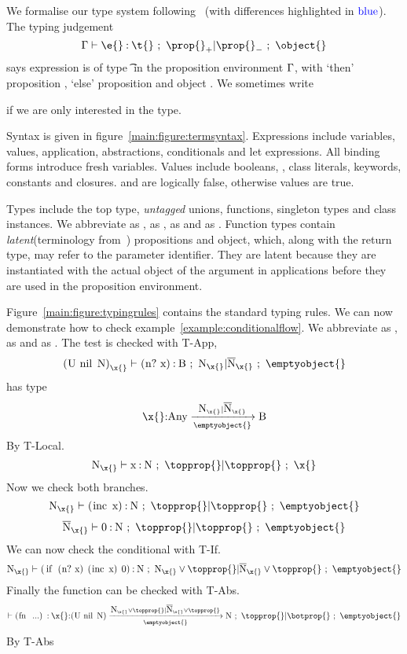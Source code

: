 We formalise our type system following~\citet{TF10}
(with differences highlighted in $\mathbin{\textcolor{blue}{\text{blue}}}$).
The typing judgement 
$$
{\judgement   {\propenv}
              {\hastype {\e{}} {\t{}}}
  {\filterset {\thenprop {\prop{}}}
              {\elseprop {\prop{}}}}
  {\object{}}}
$$
says expression \e{} is of type \t{} in the 
proposition environment $\Gamma{}$, with 
`then' proposition {\thenprop {\prop{}}}, `else' proposition {\elseprop {\prop{}}}
and object \object{}. We sometimes write 
{\judgementtwo{\propenv}{\hastype {\e{}} {\t{}}} if we are only interested in the type.

Syntax is given in figure~\ref{main:figure:termsyntax}. Expressions include variables, values,
application, abstractions, conditionals and let expressions.
All binding forms introduce fresh variables.
Values include booleans, \nil{}, class literals, keywords, 
constants and closures. \false{} and \nil{} are logically false, otherwise values are true.

Types include the top type, \emph{untagged} unions, functions, singleton types
and class instances. We abbreviate \EmptyUnion{} as \Bot{}, {\ValueNil} as \Nil{}, 
{\ValueTrue} as \True and {\ValueFalse} as {\False}.
Function types contain \emph{latent}(terminology from~\cite{Lucassen88polymorphiceffect}) propositions and object, which, along with the return type,
may refer to the parameter identifier. They are latent because they are instantiated with the
actual object of the argument in applications before they are used in the proposition environment.

Figure~\ref{main:figure:typingrules} contains the standard typing rules.
We can now demonstrate how to check example~\ref{example:conditionalflow}.
We abbreviate  as ,   as  and  as .
The test is checked with T-App, 
$$
\judgement{\isprop{\clj{(U nil N)}}{\x{}}}{\hastype{\clj{(n? x)}}{\clj{B}}}{\filterset{\isprop{\clj{N}}{\x{}}}{\notprop{\clj{N}}{\x{}}}}{\emptyobject{}}
$$
 has type
$$
{\ArrowOne{\x{}}{\clj{Any}}{\clj{B}}
        {\filterset{\isprop{\clj{N}}{\x{}}}{\notprop{\clj{N}}{\x{}}}}{\emptyobject{}}}
$$
By T-Local.
$$
\judgement{\isprop{\clj{N}}{\x{}}}{\hastype{\clj{x}}{\clj{N}}}{\filterset{\topprop{}}{\topprop{}}}{\x{}}
$$
Now we check both branches.
$$
\judgement{\isprop{\clj{N}}{\x{}}}{\hastype{\clj{(inc x)}}{\clj{N}}}{\filterset{\topprop{}}{\topprop{}}}{\emptyobject{}}
$$
$$
\judgement{\notprop{\clj{N}}{\x{}}}{\hastype{\clj{0}}{\clj{N}}}{\filterset{\topprop{}}{\topprop{}}}{\emptyobject{}}
$$
We can now check the conditional with T-If.
$$
\judgement{\isprop{\clj{N}}{\x{}}}{\hastype{\clj{(if (n? x) (inc x) 0)}}{\clj{N}}}{\filterset{\orprop{\isprop{\clj{N}}{\x{}}}{\topprop{}}}{\orprop{\notprop{\clj{N}}{\x{}}}{\topprop{}}}}{\emptyobject{}}
$$
Finally the function can be checked with T-Abs.
$$
\judgement{}{\hastype{\clj{(fn ...)}}
                                             {\ArrowOne{\x{}}{\clj{(U nil N)}}{\clj{N}}
        {\filterset{\orprop{\isprop{\clj{N}}{\x{}}}{\topprop{}}}{\orprop{\notprop{\clj{N}}{\x{}}}{\topprop{}}}}{\emptyobject{}}}}
  {\filterset{\topprop{}}{\botprop{}}}{\emptyobject{}}
$$
By T-Abs

}
